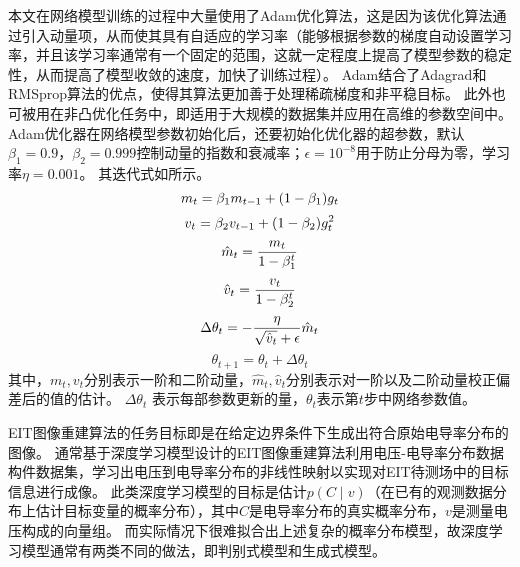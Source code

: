 本文在网络模型训练的过程中大量使用了Adam优化算法\cite{2014Adam}，这是因为该优化算法通过引入动量项，从而使其具有自适应的学习率（能够根据参数的梯度自动设置学习率，并且该学习率通常有一个固定的范围，这就一定程度上提高了模型参数的稳定性，从而提高了模型收敛的速度，加快了训练过程）。
Adam结合了Adagrad和RMSprop算法的优点，使得其算法更加善于处理稀疏梯度和非平稳目标。
此外也可被用在非凸优化任务中，即适用于大规模的数据集并应用在高维的参数空间中。
Adam优化器在网络模型参数初始化后，还要初始化优化器的超参数，默认$\beta_1 = 0.9$，$\beta_2 = 0.999$控制动量的指数和衰减率；$\epsilon = 10^{-8}$用于防止分母为零，学习率$\eta = 0.001$。
其迭代式如所示。
\begin{equation}
  \label{equation:Adamiter:a1}
  \centering
  m_t  = \beta_1 m_{t-1} + (1 - \beta_1) g_t
\end{equation}
\begin{equation}
  \label{equation:Adamiter:a2}
  \centering
  v_t  = \beta_2 v_{t-1} + (1 - \beta_2) g_t^2
\end{equation}
\begin{equation}
  \label{equation:Adamiter:a3}
  \centering  
  \hat{m}_t  = \frac{m_t}{1 - \beta_1^t}
\end{equation}
\begin{equation}
  \label{equation:Adamiter:a4}
  \centering
  \hat{v}_t  = \frac{v_t}{1 - \beta_2^t} 
\end{equation}
\begin{equation}
  \label{equation:Adamiter:a5}
  \centering
  \Delta \theta_t  = -\frac{\eta}{\sqrt{\hat{v}_t} + \epsilon} \hat{m}_t 
\end{equation}
\begin{equation}
  \label{equation:Adamiter:a6}
  \theta_{t+1} = \theta_t + \Delta \theta_t 
\end{equation}
其中，$m_t, v_t$分别表示一阶和二阶动量，$\hat{m}_t, \hat{v}_t$分别表示对一阶以及二阶动量校正偏差后的值的估计。
$\Delta\theta_t$ 表示每部参数更新的量，$\theta_t$表示第$t$步中网络参数值。

EIT图像重建算法的任务目标即是在给定边界条件下生成出符合原始电导率分布的图像。
通常基于深度学习模型设计的EIT图像重建算法利用电压-电导率分布数据构件数据集，学习出电压到电导率分布的非线性映射以实现对EIT待测场中的目标信息进行成像。
此类深度学习模型的目标是估计$p(C \mid v)$（在已有的观测数据分布上估计目标变量的概率分布），其中$C$是电导率分布的真实概率分布，$v$是测量电压构成的向量组。
而实际情况下很难拟合出上述复杂的概率分布模型，故深度学习模型通常有两类不同的做法，即判别式模型和生成式模型。


